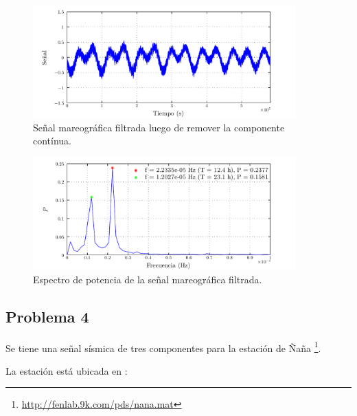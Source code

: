\documentclass[a4paper,12pt,final]{article}
\begin{document}
      \begin{figure}[H]
        \begin{center}
          \caption{Señal mareográfica filtrada luego de remover la componente contínua.}
          \label{p3f3}
          \vspace{-1em}
          \includegraphics[width=0.9\textwidth]{./laboratorio_5/problema03_signal_removed_mean.pdf}
        \end{center}
      \end{figure}
      \vfill

      \newpage
      \begin{figure}[H]
        \begin{center}
          \caption{Espectro de potencia de la señal mareográfica filtrada.}
          \label{p3f4}
          \vspace{-1em}
          \includegraphics[width=0.9\textwidth]{./laboratorio_5/problema03_power_spectrum.pdf}
        \end{center}
      \end{figure}

  \newpage
  \subsection*{Problema 4}
    \noindent Se tiene una señal sísmica de tres componentes para la estación de
      Ñaña \footnote{\url{http://fenlab.9k.com/pds/nana.mat}}.

      \noindent La estación está ubicada en :
\end{document}
